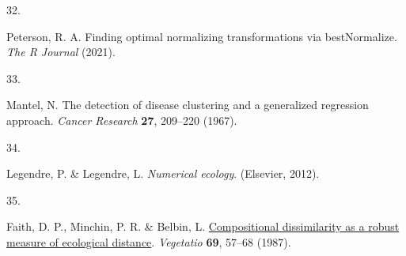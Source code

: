 \documentclass[
  10pt,
  letterpaper,
  DIV=11,
  numbers=noendperiod]{scrartcl}
\newlength{\cslhangindent}
\newlength{\csllabelwidth}
\newlength{\cslentryspacingunit} %
\newenvironment{CSLReferences}[2] %
 {%
  \setlength{\parindent}{0pt}
  \ifodd #1
  \let\oldpar\par
  \def\par{\hangindent=\cslhangindent\oldpar}
  \fi
  \setlength{\parskip}{#2\cslentryspacingunit}
 }%
 {}
\newcommand{\CSLLeftMargin}[1]{\parbox[t]{\csllabelwidth}{#1}}
\newcommand{\CSLRightInline}[1]{\parbox[t]{\linewidth - \csllabelwidth}{#1}\break}
\begin{document}
\begin{CSLReferences}{0}{0}
\leavevmode{}%
\CSLLeftMargin{32. }%
\CSLRightInline{Peterson, R. A. Finding optimal normalizing
transformations via bestNormalize. \emph{The R Journal} (2021).}

\leavevmode{}%
\CSLLeftMargin{33. }%
\CSLRightInline{Mantel, N. The detection of disease clustering and a
generalized regression approach. \emph{Cancer Research} \textbf{27},
209--220 (1967).}

\leavevmode{}%
\CSLLeftMargin{34. }%
\CSLRightInline{Legendre, P. \& Legendre, L. \emph{Numerical ecology}.
(Elsevier, 2012).}

\leavevmode{}%
\CSLLeftMargin{35. }%
\CSLRightInline{Faith, D. P., Minchin, P. R. \& Belbin, L.
\href{https://doi.org/10.1007/BF00038687}{Compositional dissimilarity as
a robust measure of ecological distance}. \emph{Vegetatio} \textbf{69},
57--68 (1987).}

\end{CSLReferences}
\end{document}
